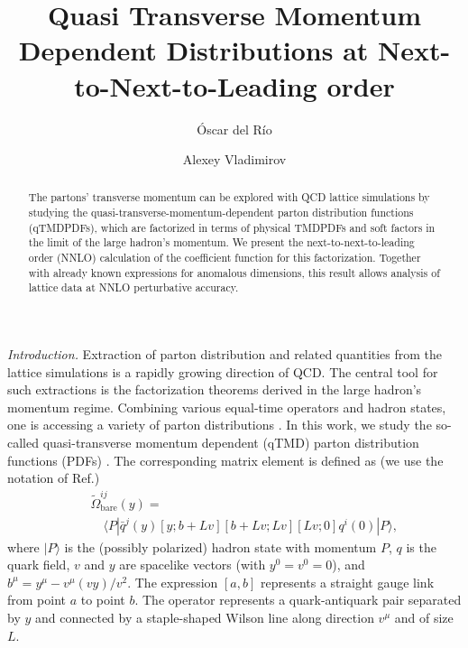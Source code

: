 \documentclass[aps,prl,twocolumn,secnumarabic,notitlepage,superscriptaddress,nofootinbib,tightenlines,floatfix,preprintnumbers]{revtex4-1}
\newcommand{\nn}{\nonumber}
\renewcommand{\(}{\left(}
\renewcommand{\)}{\right)}
\renewcommand{\[}{\left[}
\renewcommand{\]}{\right]}
\begin{document}
\title{Quasi Transverse Momentum Dependent Distributions at Next-to-Next-to-Leading order}

\author{Óscar del Río}
\author{Alexey Vladimirov}

\begin{abstract}
The partons' transverse momentum can be explored with QCD lattice simulations by studying the quasi-transverse-momentum-dependent parton distribution functions (qTMDPDFs), which are factorized in terms of physical TMDPDFs and soft factors in the limit of the large hadron's momentum. We present the next-to-next-to-leading order (NNLO) calculation of the coefficient function for this factorization. Together with already known expressions for anomalous dimensions, this result allows analysis of lattice data at NNLO perturbative accuracy.
\end{abstract}

\maketitle

\textit{Introduction.} Extraction of parton distribution and related quantities from the lattice simulations is a rapidly growing direction of QCD. The central tool for such extractions is the factorization theorems derived in the large hadron's momentum regime. Combining various equal-time operators and hadron states, one is accessing a variety of parton distributions \cite{Lin:2017snn, Constantinou:2020hdm}. In this work, we study the so-called quasi-transverse momentum dependent (qTMD) parton distribution functions (PDFs) \cite{Constantinou:2020hdm, Constantinou:2022yye}. The corresponding matrix element is defined as (we use the notation of Ref.\cite{Rodini:2022wic})
\begin{eqnarray}
\label{def:quasiTMD}
&&\widetilde{\Omega}_{\text{bare}}^{ij}(y) = 
\\\nn && \quad \langle P|\bar{q}^j(y) [y; b+Lv][b+Lv;Lv][Lv;0]q^i(0)|P\rangle,
\end{eqnarray}
where $|P\rangle$ is the (possibly polarized) hadron state with momentum $P$, $q$ is the quark field, $v$ and $y$ are spacelike vectors (with $y^0=v^0=0$), and $b^\mu=y^\mu-v^\mu (vy)/v^2$. The expression $[a,b]$ represents a straight gauge link from point $a$ to point $b$. The operator represents a quark-antiquark pair separated by $y$ and connected by a staple-shaped Wilson line along direction $v^\mu$ and of size $L$. 
\end{document}

